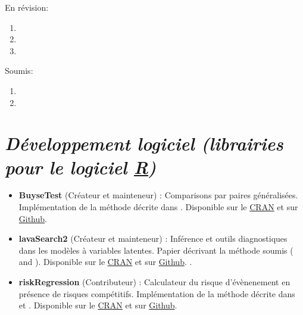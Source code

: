 \documentclass[12pt]{article}
\begin{document}
\pagebreak[3]

En révision:
 \begin{enumerate}
    \item {}
    \item {}
    \item {}
\end{enumerate}

\pagebreak[3]

Soumis:
\begin{enumerate}
   \item {}    
   \item {}
 \end{enumerate}

\pagebreak[3]

\section*{\emph{Développement logiciel (librairies pour le logiciel \href{https://www.r-project.org/}{R})}}
\label{sec:org13164b6}
\begin{minipage}{0.01\textwidth}
\hspace{\fill}
\end{minipage}
\begin{minipage}{0.92\textwidth}
\begin{itemize}
\item \textbf{BuyseTest} (Créateur et mainteneur) : Comparisons par paires
généralisées. Implémentation de la méthode décrite dans
\citep{peron2016extension,peron20XXunbiased}. Disponible sur le \href{https://cran.r-project.org/web/packages/BuyseTest/index.html}{CRAN}
et sur \href{https://github.com/bozenne/BuyseTest}{Github}.

\item \textbf{lavaSearch2} (Créateur et mainteneur) : Inférence et outils
diagnostiques dans les modèles à variables latentes. Papier
décrivant la méthode soumis (\citep{ozenne20XXsmall} and \citep{ozenne20XXcontroling}). Disponible sur le \href{https://cran.r-project.org/web/packages/lavaSearch2/index.html}{CRAN} et sur \href{https://github.com/bozenne/lavaSearch2}{Github}. .

\item \textbf{riskRegression} (Contributeur) : Calculateur du risque
d'évènenement en présence de risques compétitifs. Implémentation de
la méthode décrite dans \citep{ozenne2017riskregression} et
\citep{ozenne20XXestimation}. Disponible sur le \href{https://cran.r-project.org/web/packages/riskRegression/index.html}{CRAN} et sur \href{https://github.com/tagteam/riskRegression}{Github}.
\end{itemize}
\end{minipage}
\end{document}
